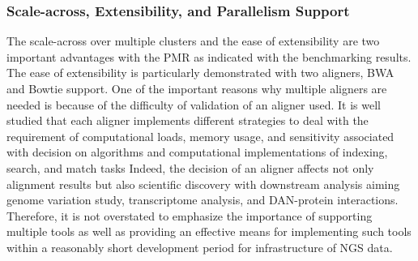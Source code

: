 \documentclass{sig-alternate}
\begin{document}
{%
%

\subsubsection{Scale-across, Extensibility, and Parallelism Support}
The scale-across over multiple clusters and the ease of extensibility are two important advantages with the PMR as indicated with the benchmarking results.  The ease of extensibility is particularly demonstrated with two aligners, BWA and Bowtie support.  One of the important reasons why multiple aligners are needed is because of the difficulty of validation of an aligner used.  It is well studied that each aligner implements different strategies to deal with the requirement of computational loads, memory usage, and sensitivity associated with decision on algorithms and computational implementations of indexing, search, and match tasks\cite{mapping-survey}   Indeed, the decision of an aligner affects not only alignment results but also scientific discovery with downstream analysis aiming genome variation study, transcriptome analysis, and DAN-protein interactions. Therefore, it is not overstated to emphasize the importance of supporting multiple tools as well as providing an effective means for implementing such tools within a reasonably short development period for infrastructure of NGS data. 


}
\end{document}
